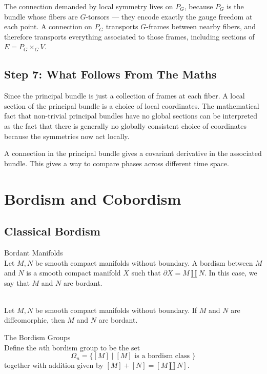 \documentclass[a4paper]{article}
\begin{document}
The connection demanded by local symmetry lives on $P_G$, because $P_G$ is the bundle whose 
fibers are $G$-torsors — they encode exactly the gauge freedom at each point. A connection 
on $P_G$ transports $G$-frames between nearby fibers, and therefore transports everything 
associated to those frames, including sections of $E = P_G \times_G V$.

\subsection*{Step 7: What Follows From The Maths}

Since the principal bundle is just a collection of frames at each fiber. A local section of the principal bundle is a choice of local coordinates. The mathematical fact that non-trivial principal bundles have no global sections can be interpreted as the fact that there is generally no globally consistent choice of coordinates because the symmetries now act locally. 

A connection in the principal bundle gives a covariant derivative in the associated bundle. This gives a way to compare phases across different time space. 

\pagebreak
\section{Bordism and Cobordism}
\subsection{Classical Bordism}
\begin{defn}{Bordant Manifolds}{}\\
Let $M,N$ be smooth compact manifolds without boundary. A bordism between $M$ and $N$ is a smooth compact manifold $X$ such that $\partial X=M\amalg N$. In this case, we say that $M$ and $N$ are bordant. 
\end{defn}

\begin{prp}{}{}\\
Let $M,N$ be smooth compact manifolds without boundary. If $M$ and $N$ are diffeomorphic, then $M$ and $N$ are bordant. 
\end{prp}

\begin{defn}{The Bordism Groups}{}\\
Define the $n$th bordism group to be the set $$\Omega_n=\{[M]\;|\;[M]\text{ is a bordism class }\}$$ together with addition given by $[M]+[N]=[M\amalg N]$. 
\end{defn}
\end{document}
